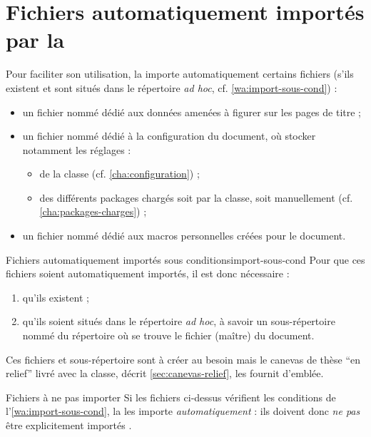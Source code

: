 \chapter{Fichiers automatiquement importés par la \yatcl{}}
\label{cha:fichiers-importes-par}

Pour faciliter son utilisation, la \yatcl{} importe automatiquement certains
fichiers (s'ils existent et sont situés dans le répertoire \emph{ad hoc},
cf. \vref{wa:import-sous-cond}) :
\begin{itemize}
\item un fichier nommé \file{\titlefile} dédié aux données amenées à figurer
  sur les pages de titre ;
\item un fichier nommé \file{\configurationfile} dédié à la configuration du
  document, où stocker notamment les réglages :
  \begin{itemize}
  \item de la classe \yatcl (cf. \vref{cha:configuration}) ;
  \item des différents packages chargés soit par la classe, soit manuellement
    (cf. \vref{cha:packages-charges}) ;
  \end{itemize}
\item un fichier nommé \file{\macrosfile} dédié aux macros personnelles créées
  pour le document.
\end{itemize}
\begin{dbwarning}{Fichiers automatiquement importés sous conditions}{import-sous-cond}
  Pour que ces fichiers soient automatiquement importés, il est donc
  nécessaire :
  \begin{enumerate}
  \item qu'ils existent ;
  \item qu'ils soient situés dans le répertoire \emph{ad hoc}, à savoir un
    sous-répertoire nommé \directory{\configurationdirectory} du répertoire où
    se trouve le fichier (maître) du document.
  \end{enumerate}
\end{dbwarning}
Ces fichiers et sous-répertoire sont à créer au besoin mais le canevas de thèse
\enquote{en relief} livré avec la classe, décrit \vref{sec:canevas-relief}, les
fournit d'emblée.
\begin{dbwarning}{Fichiers à ne pas importer}{}
  Si les fichiers ci-dessus vérifient les conditions de
  l'\vref{wa:import-sous-cond}, la \yatcl{} les importe
  \emph{automatiquement} : ils doivent donc \emph{ne pas} être explicitement
  importés .
\end{dbwarning}
